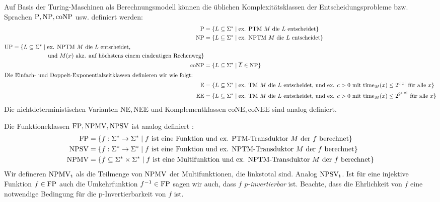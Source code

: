 Auf Basis der Turing-Maschinen als Berechnungsmodell können die üblichen Komplexitätsklassen der Entscheidungsprobleme bzw. Sprachen $\mathrm{P}, \mathrm{NP}, \mathrm{coNP}$ usw. definiert werden:
\begin{align*}
    \mathrm{P} &= \{ L\subseteq\Sigma^* \mid \text{ex. PTM $M$ die $L$ entscheidet} \}\\
    \mathrm{NP} &= \{ L\subseteq\Sigma^* \mid \text{ex. NPTM $M$ die $L$ entscheidet} \}\\
\begin{split} \mathrm{UP} &= \{ L\subseteq\Sigma^* \mid  \text{ex. NPTM $M$ die $L$ entscheidet,}\\ &\qquad\qquad\qquad\text{und $M(x)$ akz. auf höchstens einem eindeutigen Rechenweg} \}\end{split}\\
    \mathrm{coNP} &= \{ L\subseteq\Sigma^* \mid \overline{L}\in\mathrm{NP} \}\\
\intertext{Die Einfach- und Doppelt-Exponentialzeitklassen definieren wir wie folgt:}
    \mathrm{E} &= \{ L\subseteq\Sigma^* \mid \text{ex. TM $M$ die $L$ entscheidet, und ex. $c>0$ mit $\mathrm{time}_M(x) \leq 2^{c|x|}$ für alle $x$} \}\\
    \mathrm{EE} &= \{ L\subseteq\Sigma^* \mid \text{ex. TM $M$ die $L$ entscheidet, und ex. $c>0$ mit $\mathrm{time}_M(x) \leq 2^{2^{c|x|}}$ für alle $x$} \}
\end{align*}
Die nichtdeterministischen Varianten $\mathrm{NE}, \mathrm{NEE}$ und Komplementklassen $\mathrm{coNE}, \mathrm{coNEE}$ sind analog definiert.

Die Funktioneklassen $\mathrm{FP}, \mathrm{NPMV}, \mathrm{NPSV}$ ist analog definiert \parencite{selman_taxonomy_1994}:
\begin{align*}
    \mathrm{FP} &= \{ f: \Sigma^*\to\Sigma^* \mid \text{$f$ ist eine Funktion und ex. PTM-Transduktor $M$ der $f$ berechnet} \}\\
    \mathrm{NPSV} &= \{ f:\Sigma^*\to\Sigma^* \mid \text{$f$ ist eine Funktion und ex. NPTM-Transduktor $M$ der $f$ berechnet} \}\\
    \mathrm{NPMV} &= \{ f\subseteq \Sigma^*\times\Sigma^* \mid \text{$f$ ist eine Multifunktion und ex. NPTM-Transduktor $M$ der $f$ berechnet} \}
\end{align*}
Wir defineren $\mathrm{NPMV_t}$ als die Teilmenge von $\mathrm{NPMV}$ der Multifunktionen, die linkstotal sind. Analog $\mathrm{NPSV_t}$.
Ist für eine injektive Funktion $f\in\mathrm{FP}$ auch die Umkehrfunktion $f^{-1}\in \mathrm{FP}$ sagen wir auch, dass $f$ \emph{p-invertierbar} ist. Beachte, dass die Ehrlichkeit von $f$ eine notwendige Bedingung für die p-Invertierbarkeit von $f$ ist.


